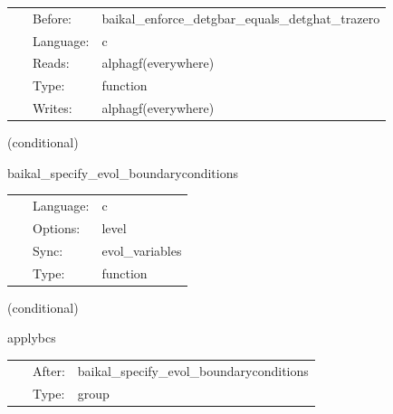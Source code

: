 \hspace{5mm}

 \begin{tabular*}{160mm}{cll} 
~ & Before:  & baikal\_enforce\_detgbar\_equals\_detghat\_trazero \\ 
~ & Language:  & c \\ 
~ & Reads:  & alphagf(everywhere) \\ 
~ & Type:  & function \\ 
~ & Writes:  & alphagf(everywhere) \\ 
\end{tabular*} 


\vspace{5mm}

   (conditional) 

\hspace{5mm} baikal\_specify\_evol\_boundaryconditions 

\hspace{5mm}{\it register boundary conditions and perform amr+interprocessor synchronization } 


\hspace{5mm}

 \begin{tabular*}{160mm}{cll} 
~ & Language:  & c \\ 
~ & Options:  & level \\ 
~ & Sync:  & evol\_variables \\ 
~ & Type:  & function \\ 
\end{tabular*} 


\vspace{5mm}

   (conditional) 

\hspace{5mm} applybcs 

\hspace{5mm}{\it apply registered boundary conditions } 


\hspace{5mm}

 \begin{tabular*}{160mm}{cll} 
~ & After:  & baikal\_specify\_evol\_boundaryconditions \\ 
~ & Type:  & group \\ 
\end{tabular*} 


\vspace{5mm}

